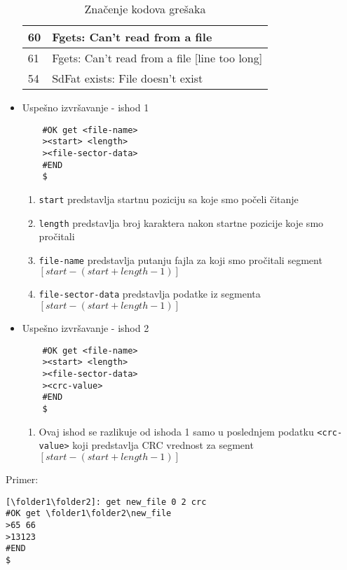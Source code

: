 \documentclass[a4paper]{extarticle}
\begin{document}
\begin{itemize}
\begin{table}[h]
\begin{tabular}{|l|l|}
			60 & Fgets: Can't read from a file                                                                                                       \\ \hline
			61 & Fgets: Can't read from a file {[}line too long{]}                                                                                   \\ \hline
			54 & SdFat exists: File doesn't exist                                                                                                    \\ \hline
		\end{tabular}
		\caption{Značenje kodova grešaka}
		\label{tab:my-table}
	\end{table}
	\item Uspešno izvršavanje - ishod 1\\
	\begin{verbatim}
	#OK get <file-name>
	><start> <length>
	><file-sector-data>
	#END
	$
	\end{verbatim}
	\begin{enumerate}
		\item \verb|start| predstavlja startnu poziciju sa koje smo počeli čitanje
		\item \verb|length| predstavlja broj karaktera nakon startne pozicije koje smo pročitali
		\item \verb|file-name| predstavlja putanju fajla za koji smo pročitali segment $[start-(start+length-1)]$
		\item \verb|file-sector-data| predstavlja podatke iz segmenta $[start-(start+length-1)]$
	\end{enumerate}
	\item Uspešno izvršavanje - ishod 2\\
	\begin{verbatim}
	#OK get <file-name>
	><start> <length>
	><file-sector-data>
	><crc-value>
	#END
	$
	\end{verbatim}
	\begin{enumerate}
		\item Ovaj ishod se razlikuje od ishoda 1 samo u poslednjem podatku \verb|<crc-value>| koji predstavlja CRC vrednost za segment $[start-(start+length-1)]$
	\end{enumerate}

\end{itemize}
Primer:
\begin{verbatim}
[\folder1\folder2]: get new_file 0 2 crc
#OK get \folder1\folder2\new_file
>65 66
>13123
#END
$
\end{verbatim}
\end{document}

